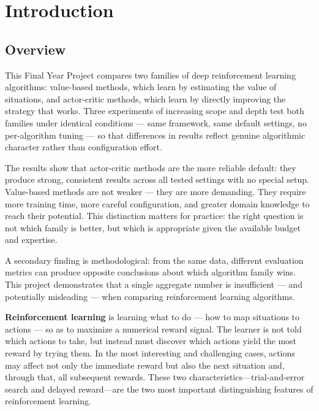 
\chapter{Introduction}


\ifpdf
    \graphicspath{{1_introduction/figures/PNG/}{1_introduction/figures/PDF/}{1_introduction/figures/}}
\else
    \graphicspath{{1_introduction/figures/EPS/}{1_introduction/figures/}}
\fi


\section{Overview}


{\color{red} 
This Final Year Project compares two families of deep reinforcement learning algorithms: value-based methods, which learn by estimating the value of situations, and actor-critic methods, which learn by directly improving the strategy that works. Three experiments of increasing scope and depth test both families under identical conditions --- same framework, same default settings, no per-algorithm tuning --- so that differences in results reflect genuine algorithmic character rather than configuration effort.

The results show that actor-critic methods are the more reliable default: they produce strong, consistent results across all tested settings with no special setup. Value-based methods are not weaker --- they are more demanding. They require more training time, more careful configuration, and greater domain knowledge to reach their potential. This distinction matters for practice: the right question is not which family is better, but which is appropriate given the available budget and expertise.

A secondary finding is methodological: from the same data, different evaluation metrics can produce opposite conclusions about which algorithm family wins. This project demonstrates that a single aggregate number is insufficient --- and potentially misleading --- when comparing reinforcement learning algorithms.
}


\textbf{Reinforcement learning} is learning what to do — how to map situations to actions — so as to maximize a numerical reward signal. The learner is not told which actions to take, but instead must discover which actions yield the most reward by trying them. In the most interesting and challenging cases, actions may affect not only the immediate reward but also the next situation and, through that, all subsequent rewards. These two characteristics—trial-and-error search and delayed reward—are the two most important distinguishing features of reinforcement learning. \cite{sutton}

